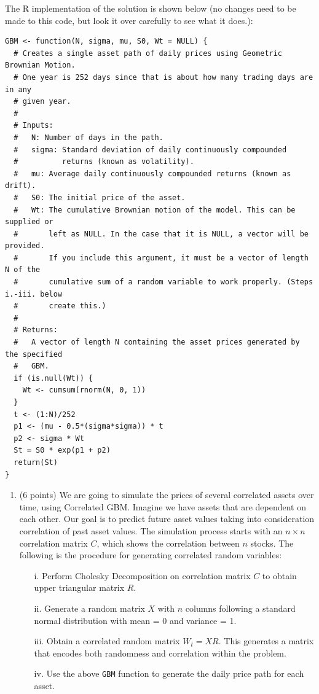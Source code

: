 \documentclass[12point]{article}
\begin{document}
\begin{enumerate}
The R implementation of the solution is shown below (no changes need to be made to this code, but look it over carefully to see what it does.):

\begin{verbatim}
GBM <- function(N, sigma, mu, S0, Wt = NULL) {
  # Creates a single asset path of daily prices using Geometric Brownian Motion. 
  # One year is 252 days since that is about how many trading days are in any
  # given year.
  #
  # Inputs:
  #   N: Number of days in the path.
  #   sigma: Standard deviation of daily continuously compounded 
  #          returns (known as volatility).
  #   mu: Average daily continuously compounded returns (known as drift). 
  #   S0: The initial price of the asset. 
  #   Wt: The cumulative Brownian motion of the model. This can be supplied or 
  #       left as NULL. In the case that it is NULL, a vector will be provided.
  #       If you include this argument, it must be a vector of length N of the 
  #       cumulative sum of a random variable to work properly. (Steps i.-iii. below    
  #       create this.) 
  #
  # Returns:
  #   A vector of length N containing the asset prices generated by the specified
  #   GBM. 
  if (is.null(Wt)) {
    Wt <- cumsum(rnorm(N, 0, 1))
  }
  t <- (1:N)/252
  p1 <- (mu - 0.5*(sigma*sigma)) * t
  p2 <- sigma * Wt
  St = S0 * exp(p1 + p2)
  return(St)
}
\end{verbatim}

\begin{enumerate}
	\item (6 points) We are going to simulate the prices of several correlated assets over time, using Correlated GBM. Imagine we have assets that are dependent on each other. Our goal is to predict future asset values taking into consideration correlation of past asset values. The simulation process starts with an $n \times n$ correlation matrix $C$, which shows the correlation between $n$ stocks. The following is the procedure for generating correlated random variables:

\begin{enumerate}
	\item[i.] Perform Cholesky Decomposition on correlation matrix $C$ to obtain upper triangular matrix $R$.
	\item[ii.] Generate a random matrix $X$ with $n$ columns following a standard normal distribution with mean = 0 and variance = 1.
	\item[iii.] Obtain a correlated random matrix $W_t = XR$. This generates a matrix that encodes both randomness and correlation within the problem.
	\item[iv.] Use the above \texttt{GBM} function to generate the daily price path for each asset.
\end{enumerate}


\end{enumerate}
\end{enumerate}
\end{document}
